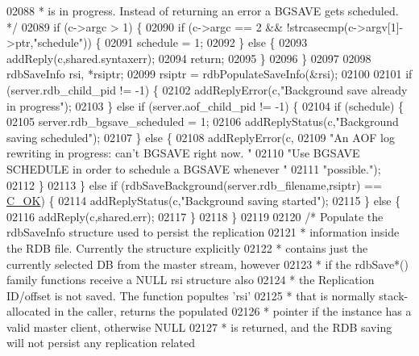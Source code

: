 \begin{DoxyCode}
{{{{{{{{{{{{{{{{{{{{{{{{{{{{{{{{{{{{{{{{{02088 \textcolor{comment}{     * is in progress. Instead of returning an error a BGSAVE gets scheduled. */}
02089     \textcolor{keywordflow}{if} (c->argc > 1) \{
02090         \textcolor{keywordflow}{if} (c->argc == 2 && !strcasecmp(c->argv[1]->ptr,\textcolor{stringliteral}{"schedule"})) \{
02091             schedule = 1;
02092         \} \textcolor{keywordflow}{else} \{
02093             addReply(c,shared.syntaxerr);
02094             \textcolor{keywordflow}{return};
02095         \}
02096     \}
02097 
02098     rdbSaveInfo rsi, *rsiptr;
02099     rsiptr = rdbPopulateSaveInfo(&rsi);
02100 
02101     \textcolor{keywordflow}{if} (server.rdb\_child\_pid != -1) \{
02102         addReplyError(c,\textcolor{stringliteral}{"Background save already in progress"});
02103     \} \textcolor{keywordflow}{else} \textcolor{keywordflow}{if} (server.aof\_child\_pid != -1) \{
02104         \textcolor{keywordflow}{if} (schedule) \{
02105             server.rdb\_bgsave\_scheduled = 1;
02106             addReplyStatus(c,\textcolor{stringliteral}{"Background saving scheduled"});
02107         \} \textcolor{keywordflow}{else} \{
02108             addReplyError(c,
02109                 \textcolor{stringliteral}{"An AOF log rewriting in progress: can't BGSAVE right now. "}
02110                 \textcolor{stringliteral}{"Use BGSAVE SCHEDULE in order to schedule a BGSAVE whenever "}
02111                 \textcolor{stringliteral}{"possible."});
02112         \}
02113     \} \textcolor{keywordflow}{else} \textcolor{keywordflow}{if} (rdbSaveBackground(server.rdb\_filename,rsiptr) == \hyperlink{server_8h_a303769ef1065076e68731584e758d3e1}{C\_OK}) \{
02114         addReplyStatus(c,\textcolor{stringliteral}{"Background saving started"});
02115     \} \textcolor{keywordflow}{else} \{
02116         addReply(c,shared.err);
02117     \}
02118 \}
02119 
02120 \textcolor{comment}{/* Populate the rdbSaveInfo structure used to persist the replication}
02121 \textcolor{comment}{ * information inside the RDB file. Currently the structure explicitly}
02122 \textcolor{comment}{ * contains just the currently selected DB from the master stream, however}
02123 \textcolor{comment}{ * if the rdbSave*() family functions receive a NULL rsi structure also}
02124 \textcolor{comment}{ * the Replication ID/offset is not saved. The function popultes 'rsi'}
02125 \textcolor{comment}{ * that is normally stack-allocated in the caller, returns the populated}
02126 \textcolor{comment}{ * pointer if the instance has a valid master client, otherwise NULL}
02127 \textcolor{comment}{ * is returned, and the RDB saving will not persist any replication related}
}}}}}}}}}}}}}}}}}}}}}}}}}}}}}}}}}}}}}}}}}
\end{DoxyCode}
